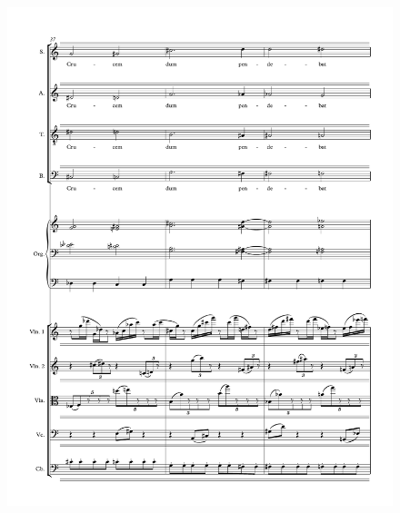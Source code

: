 \begin{figure}[htbp]
    \centering
	\includegraphics[width=6.5in]{figures/Stabat_Mater_9.pdf}
\end{figure}

